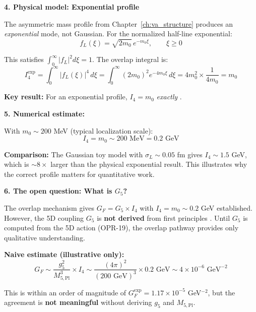 \begin{tcolorbox}[colback=cyan!5, colframe=cyan!50!black,
  title={Quantitative Mode Overlap: Why $G_F \sim 10^{-5}$ GeV$^{-2}$?}, breakable]
\textbf{4. Physical model: Exponential profile}

The asymmetric mass profile from Chapter~\ref{ch:va_structure} produces an
\emph{exponential} mode, not Gaussian. For the normalized half-line exponential:
\begin{equation}
f_L(\xi) = \sqrt{2m_0} \, e^{-m_0\xi}, \qquad \xi \geq 0
\label{eq:ch3_fL_exponential}
\end{equation}

This satisfies $\int_0^\infty |f_L|^2 d\xi = 1$. The overlap integral is:
\begin{equation}
\boxed{
I_4^{\text{exp}} = \int_0^\infty |f_L(\xi)|^4 \, d\xi
= \int_0^\infty (2m_0)^2 e^{-4m_0\xi} \, d\xi
= 4m_0^2 \times \frac{1}{4m_0} = m_0
}
\label{eq:ch3_I4_exponential_m0}
\end{equation}

\textbf{Key result:} For an exponential profile, $I_4 = m_0$ \emph{exactly} \tagDc{}.

\textbf{5. Numerical estimate:}

With $m_0 \sim 200$ MeV (typical localization scale):
\begin{equation}
I_4 = m_0 \sim 200 \text{ MeV} = 0.2 \text{ GeV}
\label{eq:ch3_I4_numerical}
\end{equation}

\textbf{Comparison:} The Gaussian toy model with $\sigma_L \sim 0.05$ fm gives
$I_4 \sim 1.5$ GeV, which is $\sim 8\times$ larger than the physical exponential
result. This illustrates why the correct profile matters for quantitative work.

\textbf{6. The open question: What is $G_5$?}

The overlap mechanism gives $G_F = G_5 \times I_4$ with $I_4 = m_0 \sim 0.2$ GeV
established. However, the 5D coupling $G_5$ is \textbf{not derived} from first
principles \tagP{}. Until $G_5$ is computed from the 5D action (OPR-19), the
overlap pathway provides only qualitative understanding.

\textbf{Naive estimate (illustrative only):}
\begin{equation}
G_F \sim \frac{g_5^2}{M_{5,\mathrm{Pl}}^3} \times I_4 \sim \frac{(4\pi)^2}{(200 \text{ GeV})^3} \times 0.2 \text{ GeV}
\sim 4 \times 10^{-6} \text{ GeV}^{-2}
\end{equation}

This is within an order of magnitude of $G_F^{\text{exp}} = 1.17 \times 10^{-5}$
GeV$^{-2}$, but the agreement is \textbf{not meaningful} without deriving $g_5$
and $M_{5,\mathrm{Pl}}$.


\end{tcolorbox}
